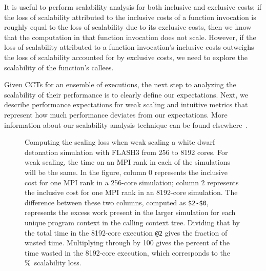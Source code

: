 \documentclass[11pt,twoside,letterpaper]{report}
\begin{document}
It is useful to perform scalability analysis for both inclusive and exclusive costs; if the loss of scalability attributed to the inclusive costs of a function invocation is roughly equal to the loss of scalability due to its exclusive costs, then we know that the computation in that function invocation does not scale.
However, if the loss of scalability attributed to a function invocation's inclusive costs outweighs the loss of scalability accounted for by exclusive costs, we need to explore the scalability of the function's callees.

Given CCTs for an ensemble of executions, the next step to analyzing the scalability of their performance is to clearly define our expectations.
Next, we describe performance expectations for weak scaling and intuitive metrics that represent how much performance deviates from our expectations.
More information about our scalability analysis technique can be found elsewhere~\cite{Coarfa-MC:2007:ICS-scalability,Tallent-MC-etal:2009:SC-hpctoolkit-petascale}.

\begin{figure}[t]
\caption{Computing the scaling loss when weak scaling a white dwarf detonation simulation with FLASH3  from 256 to 8192 cores. For weak scaling, the time on an MPI rank in each of the simulations will be the same. In the figure, column 0 represents the inclusive cost for one MPI rank in a 256-core simulation; column 2 represents the inclusive cost for one MPI rank in an 8192-core simulation.  The difference between these two columns, computed as {\tt \$2-\$0},
represents the excess work present in the larger simulation for each unique program context in the calling context tree. Dividing that by the total time in the 8192-core execution {\tt @2} gives the fraction of wasted  time. Multiplying through by 100 gives the percent of the time wasted in the 8192-core execution, which corresponds to the \%~scalability loss.}
\label{fig:scaling-loss}
\end{figure}
\end{document}
